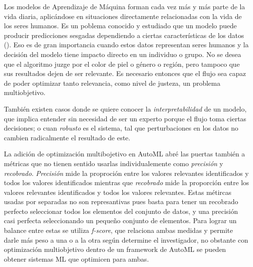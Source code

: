Los modelos de Aprendizaje de M\'aquina forman cada vez m\'as y m\'as parte de la vida diaria, aplic\'andose en situaciones directamente  relacionadas con la vida de los seres humanos. Es un poblema conocido y estudiado  que un modelo puede producir predicciones sesgadas dependiendo a ciertas caracter\'isticas de los datos (\cite{mehrabi2021survey}). Eso es de gran importancia cuando estos datos representan seres humanos y la decisi\'on del modelo tiene impacto directo en un individuo o grupo. No se desea que el algoritmo juzge por el color de piel o g\'enero o regi\'on, pero tampoco que sus resultados dejen de ser relevante. Es necesario entonces que el flujo sea capaz de poder optimizar tanto  relevancia, como  nivel de justeza, un problema multiobjetivo.

Tambi\'en existen casos donde se quiere conocer la \textit{interpretabilidad} de un modelo, que implica entender sin necesidad de ser un experto porque el flujo toma ciertas decisiones; o cuan \textit{robusto} es el sistema, tal que perturbaciones en los datos no cambien radicalmente el resultado de este.

La adici\'on de optimizaci\'on multibojetivo en AutoML abr\'e las puertas tambi\'en a m\'etricas que no tienen sentido usarlas individualemente como \textit{precisi\'on} y \textit{recobrado}.
\textit{Precisi\'on} mide la proproci\'on entre los valores relevantes identificados y todos los valores identificados mientras que \textit{recobrado} mide la proporci\'on entre los valores relevantes identificados y todos los valores relevantes. Estas m\'etircas usadas por separadas no son represantivas pues basta para tener un recobrado perfecto seleccionar todos los elementos del conjunto de datos, y una precisi\'on casi perfecta seleccionando un pequeño conjunto de elementos. Para lograr un balance entre estas se utiliza \textit{f-score}, que relaciona ambas medidas y permite darle m\'as peso a una o a la otra seg\'un determine el investigador, no obstante con optimizaci\'on multiobjetivo dentro de un framework de AutoML se pueden obtener sistemas ML que optimicen para ambas.


